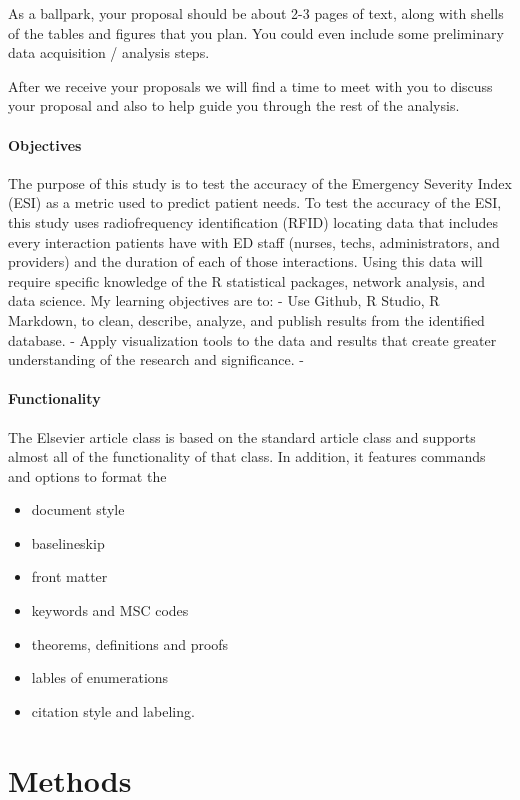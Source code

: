 \documentclass[]{elsarticle} %
\begin{document}
As a ballpark, your proposal should be about 2-3 pages of text, along
with shells of the tables and figures that you plan. You could even
include some preliminary data acquisition / analysis steps.

After we receive your proposals we will find a time to meet with you to
discuss your proposal and also to help guide you through the rest of the
analysis.

\paragraph{Objectives}\label{objectives}

The purpose of this study is to test the accuracy of the Emergency
Severity Index (ESI) as a metric used to predict patient needs. To test
the accuracy of the ESI, this study uses radiofrequency identification
(RFID) locating data that includes every interaction patients have with
ED staff (nurses, techs, administrators, and providers) and the duration
of each of those interactions. Using this data will require specific
knowledge of the R statistical packages, network analysis, and data
science. My learning objectives are to: - Use Github, R Studio, R
Markdown, to clean, describe, analyze, and publish results from the
identified database. - Apply visualization tools to the data and results
that create greater understanding of the research and significance. -

\paragraph{Functionality}\label{functionality}

The Elsevier article class is based on the standard article class and
supports almost all of the functionality of that class. In addition, it
features commands and options to format the

\begin{itemize}
\item
  document style
\item
  baselineskip
\item
  front matter
\item
  keywords and MSC codes
\item
  theorems, definitions and proofs
\item
  lables of enumerations
\item
  citation style and labeling.
\end{itemize}

\section{Methods}\label{methods}
\end{document}
